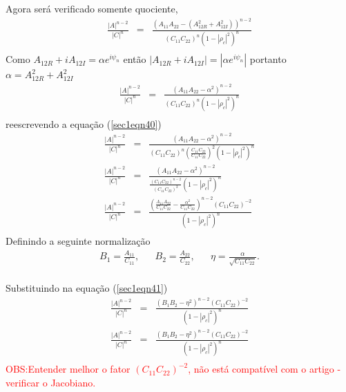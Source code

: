 \documentclass[10pt,a4paper]{article}
\begin{document}
Agora será verificado somente quociente,
\begin{equation}\label{sec1eqn39}
\begin{array}{ccc}
	\frac{\left|A\right|^{n-2}}{\left|C\right|^{n}}&=&\frac{(A_{11}A_{22}-(A_{12R}^2+A_{12I}^2))^{n-2}}{(C_{11}C_{22})^{n}(1-\left|\rho_c\right|^2)^{n}}\\
\end{array}
\end{equation}
Como  $A_{12R}+iA_{12I}=\alpha e^{i\psi_n}$ então $\left|A_{12R}+iA_{12I}\right|=|\alpha e^{i\psi_n}|$ portanto $\alpha=A_{12R}^2+A_{12I}^2$ 
\begin{equation}\label{sec1eqn40}
\begin{array}{ccc}
	\frac{\left|A\right|^{n-2}}{\left|C\right|^{n}}&=&\frac{(A_{11}A_{22}-\alpha^2)^{n-2}}{(C_{11}C_{22})^{n}(1-\left|\rho_c\right|^2)^{n}}\\
\end{array}
\end{equation}
reescrevendo a equação (\ref{sec1eqn40})
\begin{equation}\label{sec1eqn41}
\begin{array}{ccc}
	\frac{\left|A\right|^{n-2}}{\left|C\right|^{n}}&=&\frac{(A_{11}A_{22}-\alpha^2)^{n-2}}{(C_{11}C_{22})^{n}\left(\frac{C_{11}C_{22}}{C_{11}C_{22}}\right)^2(1-\left|\rho_c\right|^2)^{n}}\\
	\frac{\left|A\right|^{n-2}}{\left|C\right|^{n}}&=&\frac{(A_{11}A_{22}-\alpha^2)^{n-2}}{\frac{(C_{11}C_{22})^{n-2}}{\left(C_{11}C_{22}\right)^2}(1-\left|\rho_c\right|^2)^{n}}\\
	\frac{\left|A\right|^{n-2}}{\left|C\right|^{n}}&=&\frac{\left(\frac{A_{11}A_{22}}{C_{11}C_{22}}-\frac{\alpha^2}{C_{11}C_{22}}\right)^{n-2}(C_{11}C_{22})^{-2}}{(1-\left|\rho_c\right|^2)^{n}}\\
\end{array}
\end{equation}
Definindo a seguinte normalização 
\begin{equation}\label{sec1eqn42}
\begin{array}{ccccc}
	B_1=\frac{A_{11}}{C_{11}},&&B_2=\frac{A_{22}}{C_{22}},&&\eta=\frac{\alpha}{\sqrt{C_{11}C_{22}}}.\\
\end{array}
\end{equation}

Substituindo na equação (\ref{sec1eqn41})
\begin{equation}\label{sec1eqn43}
\begin{array}{ccc}
	\frac{\left|A\right|^{n-2}}{\left|C\right|^{n}}&=&\frac{\left(B_1B_2-\eta^2\right)^{n-2}(C_{11}C_{22})^{-2}}{(1-\left|\rho_c\right|^2)^{n}}\\
	\frac{\left|A\right|^{n-2}}{\left|C\right|^{n}}&=&\frac{\left(B_1B_2-\eta^2\right)^{n-2}(C_{11}C_{22})^{-2}}{(1-\left|\rho_c\right|^2)^{n}}\\
\end{array}
\end{equation}
\textcolor{red}{OBS:Entender melhor o fator $(C_{11}C_{22})^{-2}$, não está compatível com o artigo \cite{lee94}- verificar o Jacobiano.}
\end{document}
